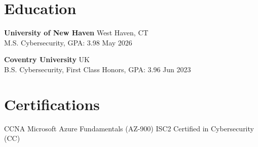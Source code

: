 \documentclass{resume2}
\begin{document}
\section{Education}
\textbf{University of New Haven} \hfill West Haven, CT\\
M.S. Cybersecurity, GPA: 3.98 \hfill May 2026

\textbf{Coventry University} \hfill UK\\
B.S. Cybersecurity, First Class Honors, GPA: 3.96 \hfill Jun 2023

\section{Certifications}
CCNA \textbullet{} Microsoft Azure Fundamentals (AZ-900) \textbullet{} ISC2 Certified in Cybersecurity (CC)
\end{document}
